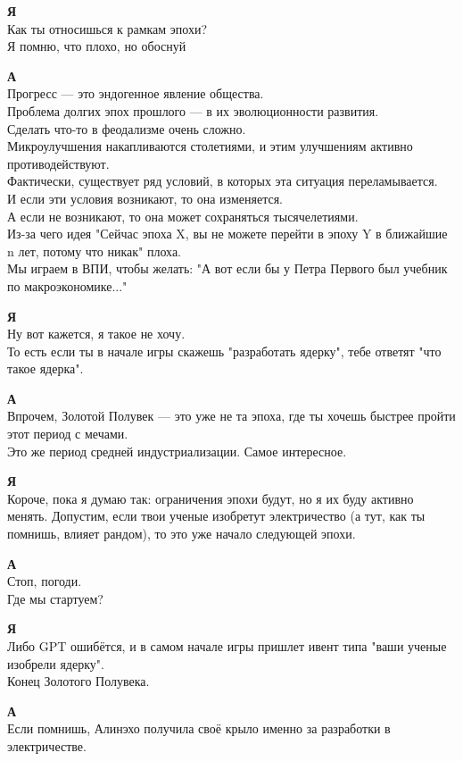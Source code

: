 \textbf{Я}\\
Как ты относишься к рамкам эпохи?\\
Я помню, что плохо, но обоснуй

\textbf{А}\\
Прогресс — это эндогенное явление общества.\\
Проблема долгих эпох прошлого — в их эволюционности развития.\\
Сделать что-то в феодализме очень сложно.\\
Микроулучшения накапливаются столетиями, и этим улучшениям активно противодействуют.\\
Фактически, существует ряд условий, в которых эта ситуация переламывается.\\
И если эти условия возникают, то она изменяется.\\
А если не возникают, то она может сохраняться тысячелетиями.\\
Из-за чего идея "Сейчас эпоха X, вы не можете перейти в эпоху Y в ближайшие n лет, потому что никак" плоха.\\
Мы играем в ВПИ, чтобы желать: "А вот если бы у Петра Первого был учебник по макроэкономике..."

\textbf{Я}\\
Ну вот кажется, я такое не хочу.\\
То есть если ты в начале игры скажешь "разработать ядерку", тебе ответят "что такое ядерка".

\textbf{А}\\
Впрочем, Золотой Полувек — это уже не та эпоха, где ты хочешь быстрее пройти этот период с мечами.\\
Это же период средней индустриализации. Самое интересное.

\textbf{Я}\\
Короче, пока я думаю так: ограничения эпохи будут, но я их буду активно менять. Допустим, если твои ученые изобретут электричество (а тут, как ты помнишь, влияет рандом), то это уже начало следующей эпохи.

\textbf{А}\\
Стоп, погоди.\\
Где мы стартуем?

\textbf{Я}\\
Либо GPT ошибётся, и в самом начале игры пришлет ивент типа "ваши ученые изобрели ядерку".\\
Конец Золотого Полувека.

\textbf{А}\\
Если помнишь, Алинэхо получила своё крыло именно за разработки в электричестве.

